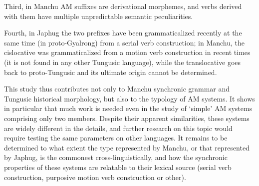 \documentclass{article}
\begin{document}
Third, in Manchu AM suffixes are derivational morphemes, and   verbs derived with them have multiple unpredictable semantic peculiarities.

Fourth, in Japhug the two prefixes have been grammaticalized recently at the same time (in proto-Gyalrong) from a serial verb construction; in Manchu, the cislocative was grammaticalized from a motion verb construction in recent times (it is not found in any other Tungusic language), while the translocative goes back to proto-Tungusic and its ultimate origin cannot be determined.


This study thus contributes not only to Manchu synchronic grammar and Tungusic historical morphology, but also to the typology of AM systems. It shows in particular that much work is needed even in the study of `simple' AM systems comprising only two members. Despite their apparent similarities, these systems are widely different in the details, and further research on this topic would require testing the same parameters on other languages. It remains to be determined to what extent the type represented by Manchu, or that represented by Japhug, is the commonest cross-linguistically, and how the synchronic properties of these systems are relatable to their lexical source (serial verb construction, purposive motion verb construction or other).




 
\end{document}
